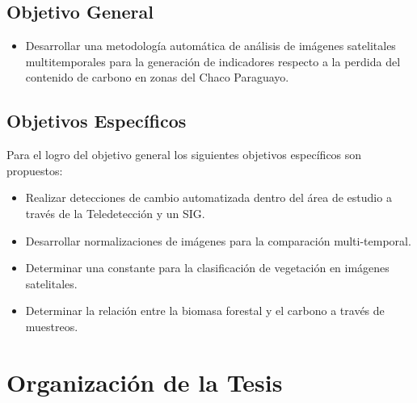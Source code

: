 \subsection{Objetivo General}

\begin{itemize}
\item Desarrollar una metodolog\'ia autom\'atica de an\'alisis de im\'agenes satelitales multitemporales para la generaci\'on de indicadores respecto a la perdida del contenido de carbono en zonas del Chaco Paraguayo.
\end{itemize}
\subsection{Objetivos Específicos}
Para el logro del objetivo general los siguientes objetivos espec\'ificos son propuestos:
\begin{itemize}


\item Realizar detecciones de cambio automatizada dentro del \'area de estudio a trav\'es de la Teledetecci\'on y un SIG.   
\item Desarrollar normalizaciones de im\'agenes para la comparación multi-temporal. 
\item Determinar una constante para la clasificaci\'on de vegetaci\'on en im\'agenes satelitales.
\item Determinar la relación entre la biomasa forestal y el carbono a trav\'es de muestreos.
 
    


\end{itemize}



\section{Organización de la Tesis}


